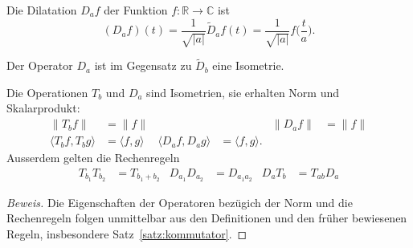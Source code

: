 
\begin{definition}
Die Dilatation $D_af$ der Funktion $f\colon\mathbb R\to\mathbb C$ ist 
\[
(D_af)(t)
=
\frac{1}{\sqrt{|a|}} \tilde{D}_af(t)
=
\frac{1}{\sqrt{|a|}} f\biggl(\frac{t}{a}\biggr).
\]
\end{definition}
Der Operator $D_a$ ist im Gegensatz zu $\tilde{D}_b$ eine Isometrie.

\begin{satz}
\label{fourier:satz:TDisometrie}
Die Operationen $T_b$ und $D_a$ sind Isometrien, sie erhalten 
Norm und Skalarprodukt:
\begin{equation}
\begin{aligned}
\|T_bf\| &= \|f\|
&&\qquad&
\|D_af\| &= \|f\|
\\
\langle T_bf,T_bg\rangle &= \langle f,g\rangle
&
\langle D_af,D_ag\rangle &= \langle f,g\rangle.
\end{aligned}
\label{fourier:satz:formel:isometrie}
\end{equation}
Ausserdem gelten die Rechenregeln
\begin{align*}
T_{b_1}T_{b_2}&=T_{b_1+b_2}
&
D_{a_1} D_{a_2}&=D_{a_1a_2}
&
D_aT_b
&=
T_{ab}D_a
\end{align*}
\end{satz}

\begin{proof}[Beweis]
Die Eigenschaften der Operatoren bezügich der Norm und die Rechenregeln
folgen unmittelbar aus den Definitionen und
den früher bewiesenen Regeln, insbesondere Satz~\ref{satz:kommutator}.
\end{proof}

